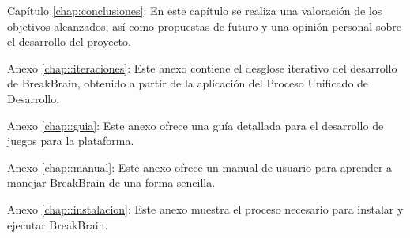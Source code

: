 \begin{definitionlist}
\item [Capítulo \ref{chap:conclusiones}: \nameref{chap:conclusiones}] En este capítulo se realiza una valoración de los objetivos alcanzados, así como propuestas de futuro y una opinión personal sobre el desarrollo del proyecto.

\item [Anexo \ref{chap::iteraciones}: \nameref{chap::iteraciones}] Este anexo contiene el desglose iterativo del desarrollo de BreakBrain, obtenido a partir de la aplicación del Proceso Unificado de Desarrollo.

\item [Anexo \ref{chap::guia}: \nameref{chap::guia}] Este anexo ofrece una guía detallada para el desarrollo de juegos para la plataforma.

\item [Anexo \ref{chap::manual}: \nameref{chap::manual}] Este anexo ofrece un manual de usuario para aprender a manejar BreakBrain de una forma sencilla.

\item [Anexo \ref{chap::instalacion}: \nameref{chap::instalacion}] Este anexo muestra el proceso necesario para instalar y ejecutar BreakBrain.
\end{definitionlist}

